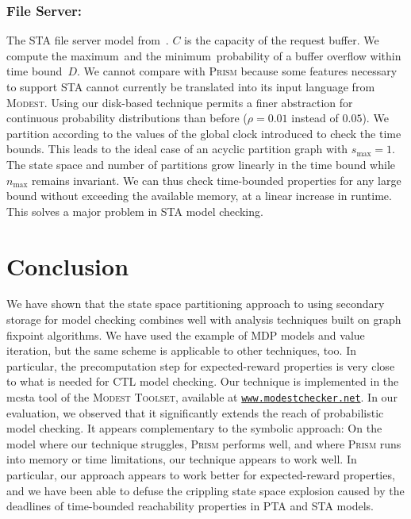 \documentclass{llncs}
\newcommand{\modest}{\textsc{\mbox{Modest}}\xspace}
\newcommand{\mcsta}{\textsf{\mbox{mcsta}}\xspace}
\newcommand{\toolset}{\textsc{\mbox{Modest} Toolset}\xspace}
\newcommand{\prism}{\textsc{Prism}\xspace}
\begin{document}
\subsubsection{File Server:}

The STA file server model from~\cite{HHH14}.
$C$ is the capacity of the request buffer.
We compute the maximum\ and the minimum\ probability of a buffer overflow within time bound~$D$.
We cannot compare with \prism because some features necessary to support STA cannot currently be translated into its input language from \modest. 
Using our disk-based technique permits a finer abstraction for continuous probability distributions than before ($\rho = 0.01$ instead of $0.05$).
We partition according to the values of the global clock introduced to check the time bounds.
This leads to the ideal case of an acyclic partition graph with $s_{\max} = 1$.
The state space and number of partitions grow linearly in the time bound while
$n_{\max}$ remains invariant.
We can thus check time-bounded properties for any large bound without exceeding the available memory, at a linear increase in runtime.
This solves a major problem in STA model checking.




\section{Conclusion}\label{sec:Conclusion}

We have shown that the state space partitioning approach to using secondary storage for model checking combines well with analysis techniques built on graph fixpoint algorithms.
We have used the example of MDP models and value iteration, but the same scheme is applicable to other techniques, too.
In particular, the precomputation step for expected-reward properties is very close to what is needed for CTL model checking.
Our technique is implemented in the \mcsta tool of the \toolset, available at \href{http://www.modestchecker.net/}{\texttt{www.modestchecker.net}}.
In our evaluation, we observed that it significantly extends the reach of probabilistic model checking.
It appears complementary to the symbolic approach:
On the model where our technique struggles, \prism performs well, and where \prism runs into memory or time limitations, our technique appears to work well.
In particular, our approach appears to work better for expected-reward properties, and we have been able to defuse the crippling state space explosion caused by the deadlines of time-bounded reachability properties in PTA and STA models.
\end{document}
